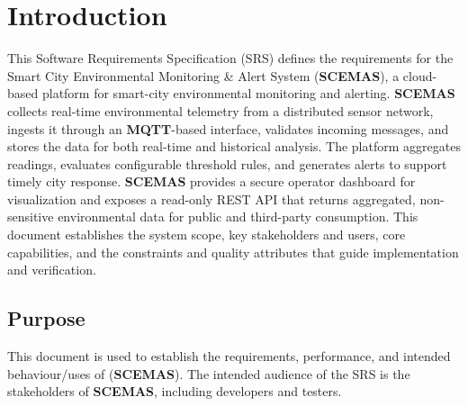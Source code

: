 \documentclass[]{article}
\begin{document}
\section{Introduction}
\label{sec:introduction}
This Software Requirements Specification (SRS) defines the requirements for the Smart City Environmental Monitoring \& Alert System (\textbf{SCEMAS}), a cloud-based platform for smart-city environmental monitoring and alerting. \textbf{SCEMAS} collects real-time environmental telemetry from a distributed sensor network, ingests it through an \textbf{MQTT}-based interface, validates incoming messages, and stores the data for both real-time and historical analysis. The platform aggregates readings, evaluates configurable threshold rules, and generates alerts to support timely city response. \textbf{SCEMAS} provides a secure operator dashboard for visualization and exposes a read-only REST API that returns aggregated, non-sensitive environmental data for public and third-party consumption. This document establishes the system scope, key stakeholders and users, core capabilities, and the constraints and quality attributes that guide implementation and verification.


\subsection{Purpose}
\label{sub:purpose}
This document is used to establish the requirements, performance, and intended behaviour/uses of (\textbf{SCEMAS}).
The intended audience of the SRS is the stakeholders of \textbf{SCEMAS}, including developers and testers.
\end{document}

